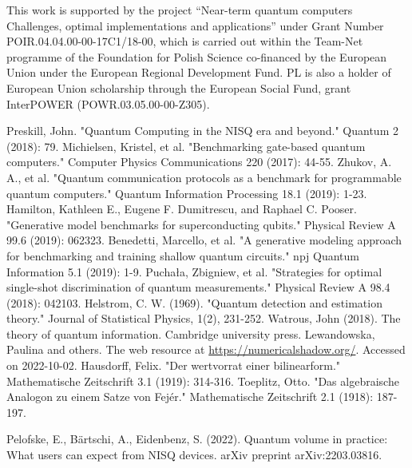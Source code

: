 \documentclass[preprint,12pt, a4paper]{elsarticle}
\newcommand{\1}{{\rm 1\hspace{-0.9mm}l}}
\begin{document}
This work is  supported by
the project “Near-term quantum computers Challenges, optimal implementations and applications” under Grant Number POIR.04.04.00-00-17C1/18-00, which is carried out within the Team-Net programme of the Foundation for Polish Science co-financed by the European Union under the European Regional Development Fund. 
PL is also a holder of European Union scholarship through the European Social Fund, 
grant InterPOWER (POWR.03.05.00-00-Z305). 
 

\begin{thebibliography}{00}

 Preskill, John. "Quantum Computing in the NISQ era and 
beyond." Quantum 2 (2018): 79.
 Michielsen, Kristel, et al. "Benchmarking 
gate-based quantum computers." Computer Physics Communications 220 (2017): 
44-55.
 Zhukov, A. A., et al. "Quantum communication 
protocols as a benchmark for programmable quantum computers." Quantum 
Information Processing 18.1 (2019): 1-23.
 Hamilton, Kathleen E., Eugene F. Dumitrescu, 
and Raphael C. Pooser. "Generative model benchmarks for superconducting 
qubits." Physical Review A 99.6 (2019): 062323.
 Benedetti, Marcello, et al. "A generative 
modeling approach for benchmarking and training shallow quantum circuits." npj 
Quantum Information 5.1 (2019): 1-9.
 Puchała, Zbigniew, et al. "Strategies for 
optimal single-shot discrimination of quantum measurements." Physical Review A 
98.4 (2018): 042103.
 Helstrom, C. W. (1969). "Quantum detection and estimation theory." Journal of Statistical Physics, 1(2), 231-252.
 Watrous, John (2018). The theory of quantum information. Cambridge university press.
 Lewandowska, Paulina and others. The web resource at \url{https://numericalshadow.org/}. Accessed on 2022-10-02. 
 Hausdorff, Felix. "Der wertvorrat einer bilinearform." Mathematische Zeitschrift 3.1 (1919): 314-316.
 Toeplitz, Otto. "Das algebraische Analogon zu einem Satze von Fejér." Mathematische Zeitschrift 2.1 (1918): 187-197.

 Pelofske, E., B{\"a}rtschi, A., Eidenbenz, S. (2022). Quantum volume in practice: What users can expect from NISQ devices. arXiv preprint arXiv:2203.03816.
\end{thebibliography}
\end{document}
